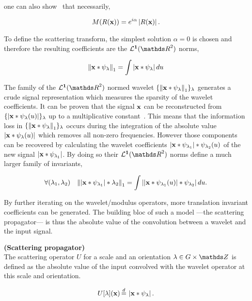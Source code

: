 \documentclass[a4paper,11pt]{report}
\begin{document}
      one can also show~\citep{bruna2012commute} that necessarily,
      
      \begin{equation*}
				M(R({\bf x}))= e^{i\alpha}\left| R({\bf x}) \right|.
				\label{eq:Non-linearity general form}
      \end{equation*}

      To define the scattering transform, the simplest solution $\alpha = 0$ is chosen and therefore the resulting coefficients are the $\mathbf{\mcalL^{1}}(\dsR^{2})$ norms,
       
      \begin{equation*}
				\label{eq:L1 norm}
				\left\lVert {\bf x} \ast \psi_{\lambda} \right\rVert_{1} = \int \left| {\bf x} \ast \psi_{\lambda} \right| du
      \end{equation*}      
      
      The family of the $\mathbf{\mcalL^{1}}(\dsR^{2})$ normed wavelet $\{ \left\lVert {\bf x} \ast \psi_{\lambda} \right\rVert_{1}\}_{\lambda}$ generates a crude signal representation which measures the sparsity of the wavelet coefficients. It can be proven that the signal ${\bf x}$ can be reconstructed from $\{\left| {\bf x} \ast \psi_{\lambda}(u) \right| \}_{\lambda}$ up to a multiplicative constant~\citep{waldspurger2015phase}. This means that the information loss in $\{\left\lVert {\bf x} \ast \psi_{\lambda} \right\rVert_{1} \}_{\lambda}$ occurs during the integration of the absolute value $\left| {\bf x} \ast \psi_{\lambda}(u) \right|$ which removes all non-zero frequencies. However those components can be recovered by calculating the wavelet coefficients $\left| {\bf x} \ast \psi_{\lambda_{1}} \right| \ast \psi_{\lambda_{2}}(u)$ of the new signal $\left| {\bf x} \ast \psi_{\lambda_{1}} \right|$. By doing so their $\mathbf{\mcalL^{1}}(\dsR^{2})$ norms define a much larger family of invariants,
      
      \begin{equation*}
				\label{eq:2nd order}
				\forall (\lambda_{1}, \lambda_{2}) \;\;\; 
				\left\lVert  \left| {\bf x} \ast \psi_{\lambda_{1}} \right| \ast \lambda_{2} \right\rVert_{1} =
				\int \left|  \left| {\bf x} \ast \psi_{\lambda_{1}}(u) \right| \ast \psi_{\lambda_{2}} \right| du.
      \end{equation*}          
      
      By further iterating on the wavelet/modulus operators, more translation invariant coefficients can be generated. The building bloc of such a model ---the scattering propagator--- is thus the absolute value of the convolution between a wavelet and the input signal.
      
      \begin{defn} \textbf{(Scattering propagator)}\\ 
				The scattering operator $U$ for a scale and an orientation $\lambda \in G \times \dsZ$ is defined as the absolute value of the input convolved with the wavelet operator at this scale and orientation.
				
				\begin{equation}
					\label{eq:scattering propagator}
					U[\lambda](\bfx) \eqdef \abs{\bfx \ast \psi_{\lambda}}.
				\end{equation}
				\label{def:SO}
			\end{defn}
						
\end{document}
